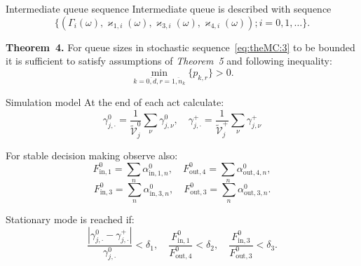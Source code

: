 \documentclass[10pt]{beamer}
\begin{document}
\begin{frame}{Intermediate queue sequence}
Intermediate queue is described with sequence
\begin{equation}
\label{eq:theMC:3}
\{(\Gamma_i(\omega), \varkappa_{1,i}(\omega),\varkappa_{3,i}(\omega),\varkappa_{4,i}(\omega)); i =0, 1, \ldots\}.
\end{equation}
\vfill
\begin{block}{\bf Theorem~4.}
For queue sizes in stochastic sequence~\eqref{eq:theMC:3} to be bounded it is sufficient to satisfy assumptions of \textit{Theorem~5} and following inequality:
\begin{equation*}
    \min_{k=\overline{0,d}, r=\overline{1,n_k}} {\{p_{k,r}\}} > 0.
\end{equation*}
\end{block}


\end{frame}




\begin{frame}{Simulation model}
   At the end of each act calculate:
\begin{equation}
   \gamma_{j,\cdot}^0 = \frac{1}{\tilde{\mathcal{V}}_j^0}\sum_{\nu} \gamma_{j,\nu}^0, \quad \gamma_{j,\cdot}^+ = \frac{1}{\tilde{\mathcal{V}}_j^+}\sum_{\nu} \gamma_{j,\nu}^+ 
\end{equation}

For stable decision making observe also: 
\begin{equation}
    F^{0}_{\text{in},1} = \sum_n \alpha^{0}_{\text{in},1,n}, \quad 
    F^{0}_{\text{out},4} = \sum_n \alpha^{0}_{\text{out},4,n},
\end{equation}
\begin{equation}
    F^{0}_{\text{in},3} = \sum_n \alpha^{0}_{\text{in},3,n}, \quad 
    F^{0}_{\text{out},3} = \sum_n \alpha^{0}_{\text{out},3,n}.
\end{equation}


Stationary mode is reached if:
\begin{equation}
    \frac{|\gamma_{j,\cdot}^0 - \gamma_{j,\cdot}^+|}{\gamma_{j,\cdot}^0} < \delta_1, \quad
    \frac{F^{0}_{\text{in},1}}{F^{0}_{\text{out},4}} < \delta_2, \quad 
    \frac{F^{0}_{\text{in},3}}{F^{0}_{\text{out},3}} < \delta_3.
\end{equation}
\end{frame}
\end{document}
